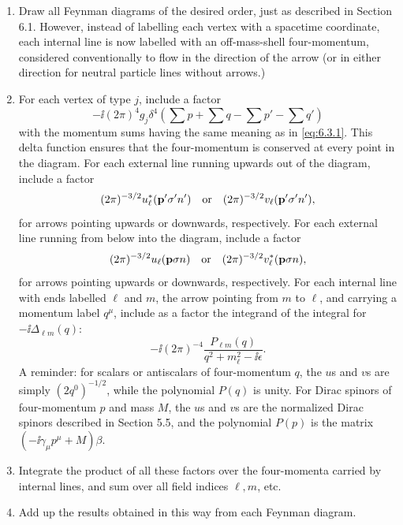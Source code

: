 \begin{enumerate}
\item[(i)] Draw all Feynman diagrams of the desired order, just as described
in Section 6.1. However, instead of labelling each vertex with a spacetime
coordinate, each internal line is now labelled with an off-mass-shell
four-momentum, considered conventionally to flow in the direction of the arrow
(or in either direction for neutral particle lines without arrows.)

\item[(ii)] For each vertex of type $j$, include a factor
\begin{equation}
-\ii(2\pi)^4g_j\delta^4\left(\sum p+\sum q-\sum p'-\sum q'\right)
\tag{6.3.2}
\label{eq:6.3.2}
\end{equation}
with the momentum sums having the same meaning as in \eqref{eq:6.3.1}. This delta
function ensures that the four-momentum is conserved at every point in the
diagram. For each external line running upwards out of the diagram, include a
factor
\[
(2\pi)^{-3/2}u_\ell^*(\mathbf p'\sigma'n')
\quad\hbox{or}\quad
(2\pi)^{-3/2}v_\ell(\mathbf p'\sigma'n'),
\]
for arrows pointing upwards or downwards, respectively. For each external line
running from below into the diagram, include a factor
\[
(2\pi)^{-3/2}u_\ell(\mathbf p\sigma n)
\quad\hbox{or}\quad
(2\pi)^{-3/2}v_\ell^*(\mathbf p\sigma n),
\]
for arrows pointing upwards or downwards, respectively. For each internal line
with ends labelled $\ell$ and
$m$, the arrow pointing from $m$ to $\ell$, and carrying a momentum label
$q^\mu$, include as a factor the integrand of the integral for
$-\ii\Delta_{\ell m}(q)$:
\begin{equation}
-\ii(2\pi)^{-4}\frac{P_{\ell m}(q)}{q^2+m_\ell^2-\ii\epsilon}.
\tag{6.3.3}
\label{eq:6.3.3}
\end{equation}
A reminder: for scalars or antiscalars of four-momentum $q$, the $u$s and $v$s
are simply $(2q^0)^{-1/2}$, while the polynomial $P(q)$ is unity. For Dirac
spinors of four-momentum $p$ and mass $M$, the $u$s and $v$s are the normalized
Dirac spinors described in Section 5.5, and the polynomial $P(p)$ is the matrix
$(-\ii\gamma_\mu p^\mu+M)\beta$.

\item[(iii)] Integrate the product of all these factors over the four-momenta
carried by internal lines, and sum over all field indices $\ell,m$, etc.

\item[(iv)] Add up the results obtained in this way from each Feynman diagram.
\end{enumerate}

